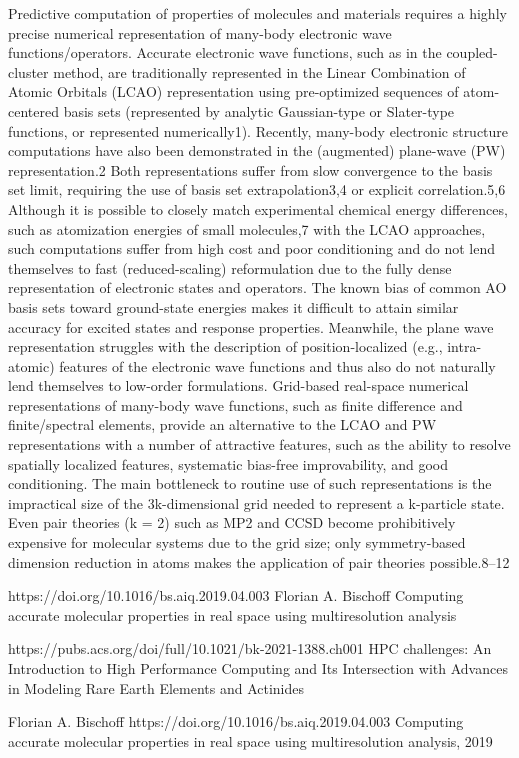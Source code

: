 \documentclass{article}
\begin{document}
Predictive computation of properties of molecules and materials requires a highly precise numerical representation of many-body electronic wave functions/operators. Accurate electronic wave functions, such as in the coupled-cluster method, are traditionally represented in the Linear Combination of Atomic Orbitals (LCAO) representation using pre-optimized sequences of atom-centered basis sets (represented by analytic Gaussian-type or Slater-type functions, or represented numerically1). Recently, many-body electronic structure computations have also been demonstrated in the (augmented) plane-wave (PW) representation.2 Both representations suffer from slow convergence to the basis set limit, requiring the use of basis set extrapolation3,4 or explicit correlation.5,6 Although it is possible to closely match experimental chemical energy differences, such as atomization energies of small molecules,7 with the LCAO approaches, such computations suffer from high cost and poor conditioning and do not lend themselves to fast (reduced-scaling) reformulation due to the fully dense representation of electronic states and operators. The known bias of common AO basis sets toward ground-state energies makes it difficult to attain similar accuracy for excited states and response properties. Meanwhile, the plane wave representation struggles with the description of position-localized (e.g., intra-atomic) features of the electronic wave functions and thus also do not naturally lend themselves to low-order formulations.
Grid-based real-space numerical representations of many-body wave functions, such as finite difference and finite/spectral elements, provide an alternative to the LCAO and PW representations with a number of attractive features, such as the ability to resolve spatially localized features, systematic bias-free improvability, and good conditioning. The main bottleneck to routine use of such representations is the impractical size of the 3k-dimensional grid needed to represent a k-particle state. Even pair theories (k = 2) such as MP2 and CCSD become prohibitively expensive for molecular systems due to the grid size; only symmetry-based dimension reduction in atoms makes the application of pair theories possible.8–12

https://doi.org/10.1016/bs.aiq.2019.04.003 Florian A. Bischoff Computing accurate molecular
properties in real space using
multiresolution analysis

https://pubs.acs.org/doi/full/10.1021/bk-2021-1388.ch001  HPC challenges: An Introduction to High Performance Computing and Its Intersection with Advances in Modeling Rare Earth Elements and Actinides

\begin{thebibliography}{}
Florian A. Bischoff https://doi.org/10.1016/bs.aiq.2019.04.003  Computing accurate molecular properties in real space using multiresolution analysis,  2019

\end{thebibliography}
\end{document}
